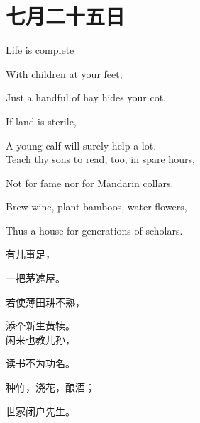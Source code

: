  \section{七月二十五日}
 {Life is complete
 	
 	With children at your feet;
 	
 	Just a handful of hay hides your cot.
 	
 	If land is sterile,
 	
 	A young calf will surely help a lot.\\
 	
 	
 	Teach thy sons to read, too, in spare hours,
 	
 	Not for fame nor for Mandarin collars.
 	
 	Brew  wine, plant bamboos, water flowers,
 	
 	Thus a house for generations of scholars.
 }
 { 
 	有儿事足，
 	
 	一把茅遮屋。
 	
 	若使薄田耕不熟，
 	
 	添个新生黄犊。\\
 	
 	闲来也教儿孙，
 	
 	读书不为功名。
 	
 	种竹，浇花，酿酒；
 	
 	世家闭户先生。
 	\\
 	\\
 	\\
 	
 }
